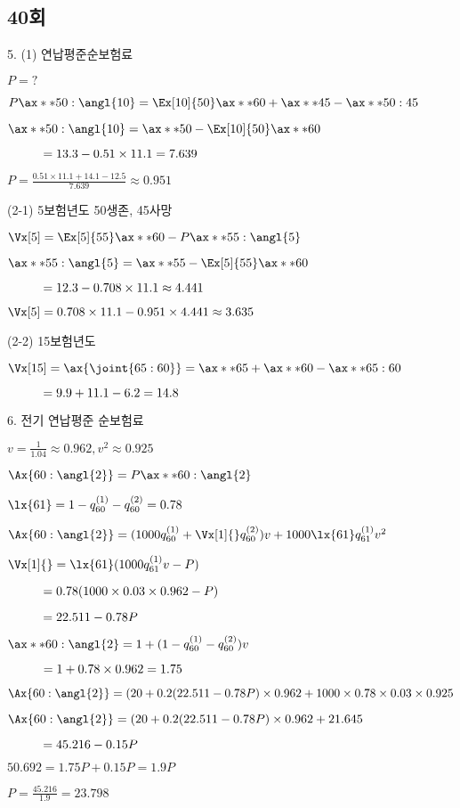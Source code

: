 \documentclass{article}
\newcommand\tab[1][1cm]{\hspace*{#1}}
\begin{document}
\begin{CJK}{UTF8}{mj}


\section*{40회}

5. (1) 연납평준순보험료

$ P = ? ~ $

$ P \ax**{50: \angl{10} } = \Ex[10]{50} \ax**{60} + \ax**{45} -  \ax**{50:45} $

$ \ax**{50: \angl{10}} = \ax**{50} - \Ex[10]{50} \ax**{60} $

$ \tab = 13.3 - 0.51 \times 11.1 = 7.639 $

$ P = \frac{0.51 \times 11.1 + 14.1 - 12.5}{7.639} \approx 0.951 $ 

(2-1) 5보험년도 50생존, 45사망

$ \Vx[5] = \Ex[5]{55} \ax**{60} - P \ax**{55: \angl{5}} $

$ \ax**{55: \angl{5}} = \ax**{55} - \Ex[5]{55} \ax**{60} $ 

$ \tab = 12.3 - 0.708 \times 11.1 \approx 4.441 $ 

$ \Vx[5] = 0.708 \times 11.1 - 0.951 \times 4.441 \approx 3.635 $

(2-2) 15보험년도 

$ \Vx[15] = \ax{\joint{65:60}} = \ax**{65} + \ax**{60} - \ax**{65:60} $ 

$ \tab = 9.9 + 11.1 - 6.2 = 14.8$


6. 전기 연납평준 순보험료

$ v = \frac{1}{1.04} \approx 0.962 , v^2 \approx 0.925 $

$ \Ax{60: \angl{2}} = P \ax**{60: \angl{2}} $

$ \lx{61} = 1 - q^{(1)}_{60} - q^{(2)}_{60} = 0.78 $

$ \Ax{60: \angl{2}} = ( 1000 q^{(1)}_{60} + \Vx[1]{} q^{(2)}_{60} ) v + 1000 \lx{61} q^{(1)}_{61} v^2  $

$ \Vx[1]{} = \lx{61} ( 1000 q^{(1)}_{61} v - P ) $ 

$ \tab = 0.78 (1000 \times 0.03 \times 0.962 - P) $

$ \tab = 22.511 - 0.78 P $

$ \ax**{60: \angl{2}} = 1 + (1 - q^{(1)}_{60} - q^{(2)}_{60}) v $

$ \tab = 1 + 0.78 \times 0.962 = 1.75 $

$ \Ax{60: \angl{2}} = ( 20 + 0.2 (22.511 - 0.78 P ) \times 0.962 + 1000 \times 0.78 \times 0.03 \times 0.925 $

$ \Ax{60: \angl{2}} = ( 20 + 0.2 (22.511 - 0.78 P ) \times 0.962 + 21.645 $

$ \tab = 45.216 - 0.15 P $

$ 50.692 = 1.75 P + 0.15 P  = 1.9 P $

$ P = \frac{45.216}{1.9} = 23.798 $


\end{CJK}
\end{document}
